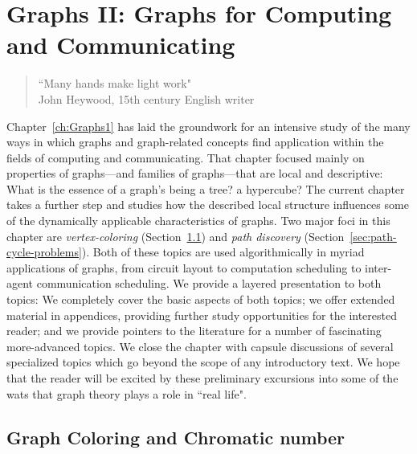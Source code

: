 
\chapter{Graphs II:
Graphs for Computing and Communicating}
\label{ch:Graphs2}

\begin{quote}
``Many hands make light work" \\ 
\hspace*{1in}John Heywood, 15th century English writer
\end{quote}

\bigskip

Chapter~\ref{ch:Graphs1} has laid the groundwork for an intensive study of the many  ways in which graphs and graph-related concepts find application within the fields of computing and communicating.  That chapter focused mainly on properties of graphs---and families of graphs---that are local and descriptive: What is the essence of a graph's being a tree? a hypercube?  The current chapter takes a further step and studies how the described local structure influences some of the dynamically applicable characteristics of graphs.  Two major foci in this chapter are {\em vertex-coloring} (Section~\ref{sec:graph-color}) and {\em path discovery} (Section~\ref{sec:path-cycle-problems}).  Both of these topics are used algorithmically in myriad applications of graphs, from circuit layout to computation scheduling to inter-agent communication scheduling.  We provide a layered presentation to both topics: We completely cover the basic aspects of both topics; we offer extended material in appendices, providing further study opportunities for the interested reader; and we provide pointers to the literature for a number of fascinating more-advanced topics.  We close the chapter with capsule discussions of several specialized topics which go beyond the scope of any introductory text.  We hope that the reader will be excited by these preliminary excursions into some of the wats that graph theory plays a role in ``real life".



\section{Graph Coloring and Chromatic number}
\label{sec:graph-color}


